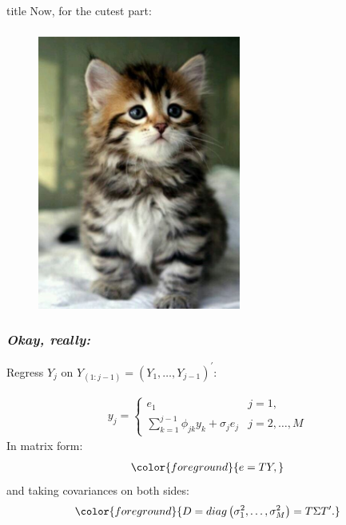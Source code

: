 \documentclass[12pt]{beamer}
\newcommand{\newmaththought}[1]{{ \color{foreground} {#1}}}
\newcommand{\ms}{\scriptscriptstyle}
\begin{document}
\begin{frame}
\frametitle{}

\vfill
  \begin{beamercolorbox}[center]{title}
\Large Now, for the cutest part:
  \end{beamercolorbox}
  \vfill

\end{frame}




\begin{frame}
\frametitle{}
\begin{figure}
\graphicspath{{img/}}
  \includegraphics[height=9cm]{cutest-kitten-ever}
\end{figure}

\end{frame}

\begin{frame}
\frametitle{\emph{Okay, really:}}

Regress $Y_j$ on $Y_{\ms{\left(1:j-1\right)}} = \left(Y_1, \dots, Y_{\ms{j-1}}\right)^\prime$:

\begin{align} \label{eq:ARmodel}
y_{j}  = \left\{  \begin{array}{ll} 
		e_1 &j=1, \\
  \sum \limits_{k=1}^{j-1} \phi_{jk} y_{k} + \sigma_{j}e_{j} &  j=2,\dots,M
\end{array}\right.
\end{align}
\noindent
In matrix form:
\begin{align}
\newmaththought{ e = TY,}
\end{align}
\noindent
 and taking covariances on both sides:
\begin{equation}
\newmaththought{ D = diag\left( \sigma_1^2,\dots, \sigma_M^2 \right) = T \Sigma T^\prime.}
\end{equation}
\end{frame}
\end{document}
